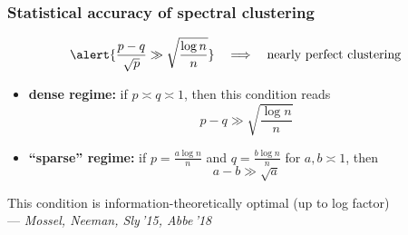 \documentclass[compress,
mathserif,wide,%
]{beamer}
\begin{document}
\begin{frame}
\frametitle{Statistical accuracy of spectral clustering}

\[
	\alert{\frac{p-q}{\sqrt{p}}\gg \sqrt{\frac{\log n}{n}}} \quad \Longrightarrow \quad \text{nearly perfect clustering} 
\]

\begin{itemize}
	\item {\bf dense regime:} if $p\asymp q \asymp 1$, then this condition reads
	      \[
			p-q \gg \sqrt{\frac{\log n}{n}}
	      \]
        \item {\bf ``sparse'' regime:} if $p = \frac{a\log n}{n}$ and $q = \frac{b \log n}{n}$ for  $a,b\asymp 1$, then 
	      \[
		      a - b \gg \sqrt{a} 
	      \]

\end{itemize}


{

\begin{varblock}[\textwidth]{}
\begin{center}
	This  condition is information-theoretically optimal (up to log factor) \\
	\hfill --- {\em Mossel, Neeman, Sly\,'15, Abbe\,'18}
\end{center}
\end{varblock}
}


\end{frame}



%	
%	
%
	
\end{document}
